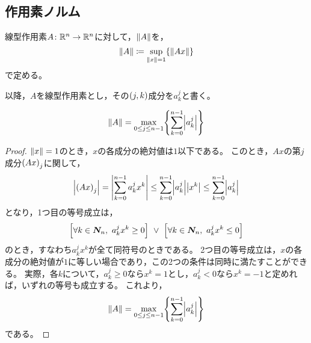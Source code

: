 \documentclass[b5paper,draft]{ltjsbook}
\begin{document}
\subsection{作用素ノルム}
\begin{defi}[作用素ノルム]
    線型作用素$A\colon \mathbb{R}^n\to\mathbb{R}^n$に対して，$\norm{A}$を，
    \begin{equation}
        \norm{A}\coloneqq \sup_{\norm{x}=1}\bra{\norm{Ax}}
    \end{equation}
    で定める。
\end{defi}

以降，$A$を線型作用素とし，その$\pare{j,k}$成分を$a^j_k$と書く。

\begin{prop}[作用素ノルムの明示公式]
    \begin{equation}
        \norm{A} = \max_{0\leq j\leq n-1} \bra{\sum_{k=0}^{n-1} \abs{a^j_k}}
    \end{equation}
    \begin{proof}
        $\norm{x}=1$のとき，$x$の各成分の絶対値は$1$以下である。
        このとき，$Ax$の第$j$成分$\pare{Ax}_j$に関して，
        \begin{equation}
            \abs{\pare{Ax}_j}=\abs{\sum_{k=0}^{n-1}a^j_k x^k}
            \leq \sum_{k=0}^{n-1}\abs{a^j_k}\abs{x^k}\leq \sum_{k=0}^{n-1}\abs{a^j_k}
        \end{equation}
        となり，1つ目の等号成立は，
        \begin{equation}
            \bsqu{\forall k\in\setN,\ a^j_kx^k\geq 0}
            \ \lor\ 
            \bsqu{\forall k\in\setN,\ a^j_kx^k\leq 0}
        \end{equation}
        のとき，すなわち$a^j_kx^k$が全て同符号のときである。
        2つ目の等号成立は，$x$の各成分の絶対値が$1$に等しい場合であり，この2つの条件は同時に満たすことができる。
        実際，各$k$について，$a^j_k\geq 0$なら$x^k=1$とし，$a^j_k<0$なら$x^k=-1$と定めれば，いずれの等号も成立する。
        これより，
        \begin{equation}
            \norm{A} = \max_{0\leq j\leq n-1} \bra{\sum_{k=0}^{n-1} \abs{a^j_k}}
        \end{equation}
        である。
    \end{proof}
\end{prop}
\end{document}
